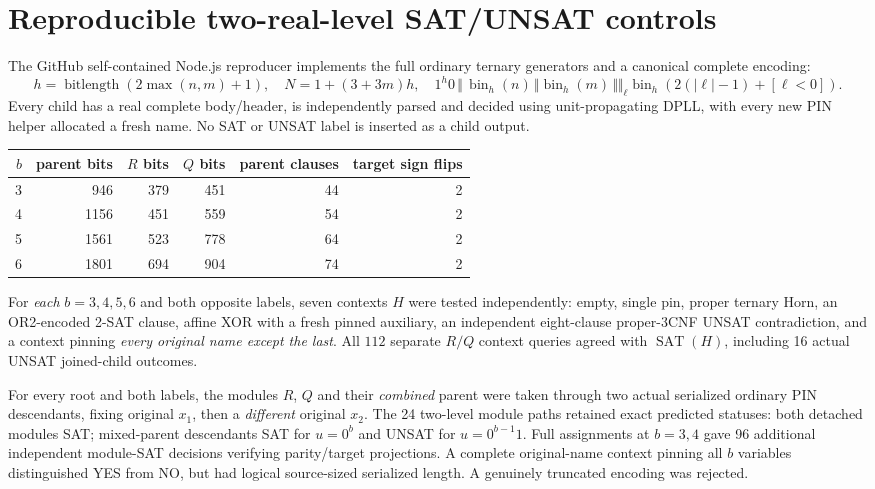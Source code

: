 \documentclass[11pt]{article}
\newcommand{\SAT}{\operatorname{SAT}}
\begin{document}
\section{Reproducible two-real-level SAT/UNSAT controls}
The GitHub self-contained Node.js reproducer implements
the full ordinary ternary generators and
a canonical complete encoding:
\[
 h=\operatorname{bitlength}(2\max(n,m)+1),\quad
 N=1+(3+3m)h,\quad
 1^h0\,\Vert\,\operatorname{bin}_h(n)\,\Vert
 \operatorname{bin}_h(m)\,\Vert
 \big\Vert_{\ell}\operatorname{bin}_h
             (2(|\ell|-1)+[\ell<0]).
 \tag{3}
\]
Every child has a real complete body/header, is independently
parsed and decided using unit-propagating DPLL, with every new
PIN helper allocated a fresh name. No SAT or UNSAT label is inserted
as a child output.

\begin{center}
\begin{tabular}{rrrrrr}
\toprule
$b$&parent bits&$R$ bits&$Q$ bits&parent clauses&target sign flips\\
\midrule
3&946&379&451&44&2\\
4&1156&451&559&54&2\\
5&1561&523&778&64&2\\
6&1801&694&904&74&2\\
\bottomrule
\end{tabular}
\end{center}

For \emph{each} $b=3,4,5,6$ and both opposite labels,
seven contexts $H$ were tested independently:
empty, single pin, proper ternary Horn, an OR2-encoded 2-SAT
clause, affine XOR with a fresh pinned auxiliary, an
independent eight-clause proper-3CNF UNSAT contradiction,
and a context pinning \emph{every original name except the last}.
All $112$ separate $R/Q$ context queries agreed with
$\SAT(H)$, including 16 actual UNSAT joined-child outcomes.

For every root and both labels, the modules $R$, $Q$ and
their \emph{combined} parent were taken through two actual
serialized ordinary PIN descendants, fixing original $x_1$,
then a \emph{different} original $x_2$.
The 24 two-level module paths retained exact predicted statuses:
both detached modules SAT; mixed-parent descendants SAT for
$u=0^b$ and UNSAT for $u=0^{b-1}1$.
Full assignments at $b=3,4$ gave 96 additional independent
module-SAT decisions verifying parity/target projections.
A complete original-name context pinning all $b$ variables
distinguished YES from NO, but had logical source-sized
serialized length. A genuinely truncated encoding was rejected.
\end{document}
